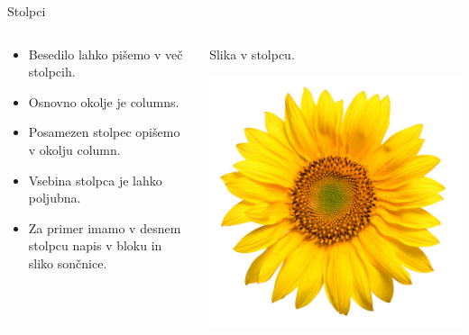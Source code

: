 \documentclass{beamer}
\begin{document}
\begin{frame}{Stolpci}
   \begin{columns}[t]
      \begin{column}{0.5\textwidth}
         \begin{itemize}
        \item Besedilo lahko pišemo v več stolpcih.
        \item Osnovno okolje je columns.
        \item Posamezen stolpec opišemo v okolju column.
        \item Vsebina stolpca je lahko poljubna.
        \item Za primer imamo v desnem stolpcu napis v bloku in sliko sončnice.
       \end{itemize}
      \end{column}
      
      
      \begin{column}{0.5\textwidth}
         \centering
      \begin{exampleblock}{}
         \centering
         Slika v stolpcu.
      \end{exampleblock}
      \includegraphics{soncnica.jpg}
      \end{column}
   \end{columns}
\end{frame}
     
\end{document}
